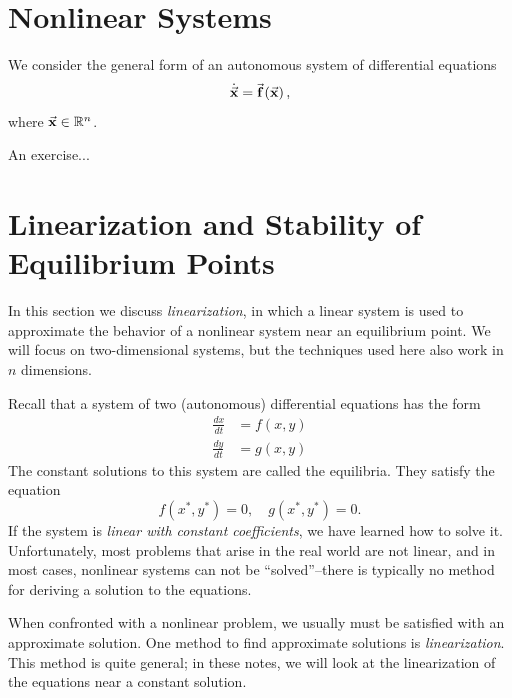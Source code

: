 \section{Nonlinear Systems}
We consider the general form of an autonomous
system of differential equations
\begin{equation}
   \dot{\vec{\textbf{x}}} = \vec{\textbf{f}}\left(\vec{\textbf{x}}\right),
   \label{eqn:NONLIN}
\end{equation}
where $\vec{\textbf{x}} \in \mathbb{R}^{n}$.

\begin{exercises}
\begin{exercise}
An exercise...
\end{exercise}
\end{exercises}

\newpage

\section{Linearization and Stability of Equilibrium Points}
\label{sec:DELinearization}

In this section we discuss \emph{linearization},
in which a linear system
is used to approximate the behavior of a nonlinear system
near an equilibrium point.
We will focus on two-dimensional systems, but the
techniques used here also work in $n$ dimensions.

Recall that a system of two (autonomous) differential equations has the form
\begin{equation}
\begin{split}
  \frac{dx}{dt} & = f(x,y) \\
  \frac{dy}{dt} & = g(x,y)
\end{split}
\label{eqn:de}
\end{equation}
The constant solutions to this system are called the equilibria.
They satisfy the equation
\begin{equation}
    f(x^*,y^*) = 0, \quad g(x^*,y^*) = 0.
\end{equation}
If the system is \emph{linear with constant
coefficients}, we have learned
how to solve it.  Unfortunately, most problems that arise in the
real world are not linear,
and in most cases, nonlinear systems can not be ``solved''--there is
typically no method for deriving a solution to the equations.

When confronted with a nonlinear problem, we usually must
be satisfied with an approximate solution.
One method to find approximate solutions is \emph{linearization}.
This method is quite general; in these notes, we will look at the
linearization of the equations near a constant solution.

